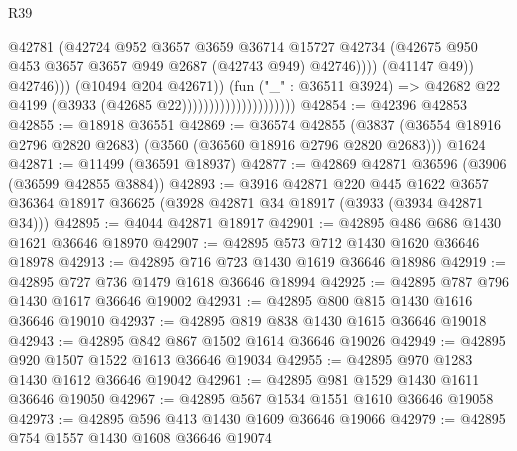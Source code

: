 \begin{lexlean}{R39}
\begin{coremodule}
                                                      @42781
                                                      (@42724
                                                        @952
                                                        @3657
                                                        @3659
                                                        @36714
                                                        @15727
                                                        @42734
                                                        (@42675
                                                          @950
                                                          @453
                                                          @3657
                                                          @3657
                                                          @949
                                                          @2687
                                                          (@42743 @949)
                                                          @42746))))
                                                  (@41147 @49))
                                                @42746)))
                                          (@10494 @204 @42671))
                                        (fun ("_" : @36511 @3924) =>
                                        @42682 @22 @4199 (@3933 (@42685 @22)))))))))))))))))))))
@42854 := @42396 @42853
@42855 := @18918 @36551
@42869 := @36574
    @42855
    (@3837 (@36554 @18916 @2796 @2820 @2683) (@3560 (@36560 @18916 @2796 @2820 @2683)))
    @1624
@42871 := @11499 (@36591 @18937)
@42877 := @42869 @42871 @36596 (@3906 (@36599 @42855 @3884))
@42893 := @3916
    @42871
    @220
    @445
    @1622
    @3657
    @36364
    @18917
    @36625
    (@3928 @42871 @34 @18917 (@3933 (@3934 @42871 @34)))
@42895 := @4044 @42871 @18917
@42901 := @42895 @486 @686 @1430 @1621 @36646 @18970
@42907 := @42895 @573 @712 @1430 @1620 @36646 @18978
@42913 := @42895 @716 @723 @1430 @1619 @36646 @18986
@42919 := @42895 @727 @736 @1479 @1618 @36646 @18994
@42925 := @42895 @787 @796 @1430 @1617 @36646 @19002
@42931 := @42895 @800 @815 @1430 @1616 @36646 @19010
@42937 := @42895 @819 @838 @1430 @1615 @36646 @19018
@42943 := @42895 @842 @867 @1502 @1614 @36646 @19026
@42949 := @42895 @920 @1507 @1522 @1613 @36646 @19034
@42955 := @42895 @970 @1283 @1430 @1612 @36646 @19042
@42961 := @42895 @981 @1529 @1430 @1611 @36646 @19050
@42967 := @42895 @567 @1534 @1551 @1610 @36646 @19058
@42973 := @42895 @596 @413 @1430 @1609 @36646 @19066
@42979 := @42895 @754 @1557 @1430 @1608 @36646 @19074

\end{coremodule}
\end{lexlean}
